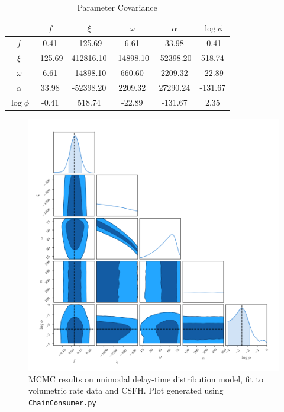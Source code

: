 \documentclass[apj]{aastex}
\begin{document}
\begin{table}
    \centering
    \caption{Parameter Covariance}
    \label{tab:parameter_covariance}
    \begin{tabular}{c|ccccc}
         & $f$ & $\xi$ & $\omega$ & $\alpha$ & $\log \phi$\\ 
        \hline
              $f$ &  0.41 & -125.69 &  6.61 & 33.98 & -0.41 \\ 
            $\xi$ & -125.69 & 412816.10 & -14898.10 & -52398.20 & 518.74 \\ 
         $\omega$ &  6.61 & -14898.10 & 660.60 & 2209.32 & -22.89 \\ 
         $\alpha$ & 33.98 & -52398.20 & 2209.32 & 27290.24 & -131.67 \\ 
        $\log \phi$ & -0.41 & 518.74 & -22.89 & -131.67 &  2.35 \\ 
        \hline
    \end{tabular}
\end{table}

\begin{figure}[t] %
   \centering
   \includegraphics[width=6.5in]{figure_sfd_corners} 
   \caption{\footnotesize MCMC results on unimodal delay-time distribution model, fit to volumetric rate data and CSFH. Plot generated using {\tt ChainConsumer.py} \citep{Hinton:2016qy}}
   \label{fig:fg2}
\end{figure}
\clearpage
\end{document}
